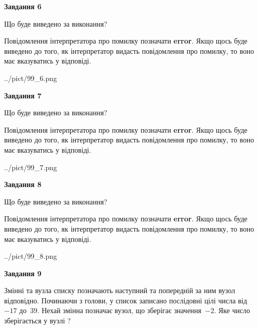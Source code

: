 \documentclass[12pt, ukrainian]{article}
\begin{document}
{\begin {large}
{\begin {center}\textbf{Завдання 6}\end {center}}\par
Що буде виведено за виконання?

Повідомлення інтерпретатора про помилку позначати \textbf{error}.
Якщо щось буде виведено до того, як інтерпретатор видасть повідомлення про помилку, 
то воно має вказуватись у відповіді. \par


\begin{center}
	{../pict/99_6.png}
\end{center}
\newpage

{\begin {center}\textbf{Завдання 7}\end {center}}\par
Що буде виведено за виконання?

Повідомлення інтерпретатора про помилку позначати \textbf{error}.
Якщо щось буде виведено до того, як інтерпретатор видасть повідомлення про помилку, 
то воно має вказуватись у відповіді. \par


\begin{center}
	{../pict/99_7.png}
\end{center}
\newpage

{\begin {center}\textbf{Завдання 8}\end {center}}\par
Що буде виведено за виконання?

Повідомлення інтерпретатора про помилку позначати \textbf{error}.
Якщо щось буде виведено до того, як інтерпретатор видасть повідомлення про помилку, 
то воно має вказуватись у відповіді. \par


\begin{center}
	{../pict/99_8.png}
\end{center}
\newpage

{\begin {center}\textbf{Завдання 9}\end {center}}\par
Змінні  та  вузла списку позначають наступний та попередній за ним вузол відповідно. Починаючи з голови, у список записано послідовні цілі числа від~$-17$ до~$39$. Нехай змінна  позначає вузол, що зберігає значення~$-2$.
Яке число зберігається у вузлі  ?\par
\newpage


\end{large}}
\end{document}
